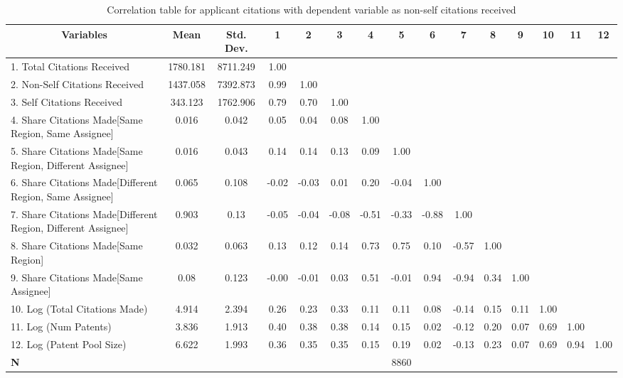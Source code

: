 \begin{table}[htbp]\centering \caption{Correlation table for applicant citations with dependent variable as non-self citations received\label{a.ncorrelation}}
\scriptsize
\onehalfspacing
\begin{adjustbox}{angle=90}
\begin{tabular}{l  c  c  c  c  c  c  c  c  c  c  c  c  c  c }\hline\hline
\multicolumn{1}{c}{Variables} & \textbf{Mean}& \textbf{Std. Dev.}&1&2&3&4&5&6&7&8&9&10&11&12\\ \hline
1. Total Citations Received& 1780.181 & 8711.249&1.00\\
2. Non-Self Citations Received& 1437.058 & 7392.873&0.99&1.00\\
3. Self Citations Received & 343.123 & 1762.906&0.79&0.70&1.00\\
4. Share Citations Made[Same Region, Same Assignee] & 0.016 & 0.042&0.05&0.04&0.08&1.00\\
5. Share Citations Made[Same Region, Different Assignee] & 0.016 & 0.043&0.14&0.14&0.13&0.09&1.00\\
6. Share Citations Made[Different Region, Same Assignee]& 0.065 & 0.108  &-0.02&-0.03&0.01&0.20&-0.04&1.00\\
7. Share Citations Made[Different Region, Different Assignee]& 0.903 & 0.13&-0.05&-0.04&-0.08&-0.51&-0.33&-0.88&1.00\\
8. Share Citations Made[Same Region]& 0.032 & 0.063&0.13&0.12&0.14&0.73&0.75&0.10&-0.57&1.00\\
9. Share Citations Made[Same Assignee]& 0.08 & 0.123&-0.00&-0.01&0.03&0.51&-0.01&0.94&-0.94&0.34&1.00\\
10. Log (Total Citations Made) & 4.914 & 2.394&0.26&0.23&0.33&0.11&0.11&0.08&-0.14&0.15&0.11&1.00\\
11. Log (Num Patents) & 3.836 & 1.913&0.40&0.38&0.38&0.14&0.15&0.02&-0.12&0.20&0.07&0.69&1.00\\
12. Log (Patent Pool Size)& 6.622 & 1.993&0.36&0.35&0.35&0.15&0.19&0.02&-0.13&0.23&0.07&0.69&0.94&1.00\\
\hline
\textbf{N}&&&&&&&8860\\
\hline \hline 
 \end{tabular}
 \end{adjustbox}
\end{table}
